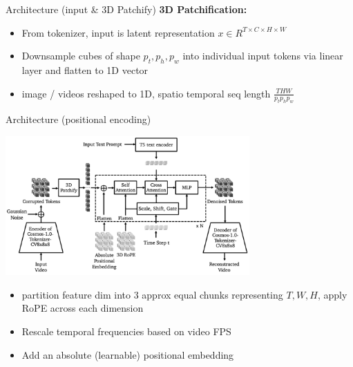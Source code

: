 \documentclass{beamer}
\begin{document}
\begin{frame}[t]{Architecture (input \& 3D Patchify)}
    \textbf{3D Patchification:}
    \begin{itemize}[label=-]
        \item From tokenizer, input is latent representation $x \in R^{T \times C \times H \times W}$ 
        \item Downsample cubes of shape $p_t, p_h, p_w$ into individual input tokens via linear layer and flatten to 1D vector
        \item image / videos reshaped to 1D, spatio temporal seq length $\frac{T H W}{p_t p_h p_w}$
    \end{itemize}
\end{frame}

\begin{frame}[t]{Architecture (positional encoding)}
    \vspace{-1.6em}
    \begin{center}
        \includegraphics[width=0.7\textwidth]{./img/diffusion_arch.png}
    \end{center}
    \begin{itemize}[label=-]
        \item partition feature dim into 3 approx equal chunks representing $T, W, H$, apply RoPE across each dimension
        \item Rescale temporal frequencies based on video FPS
        \item Add an absolute (learnable) positional embedding %
   \end{itemize}
\end{frame}
\end{document}
